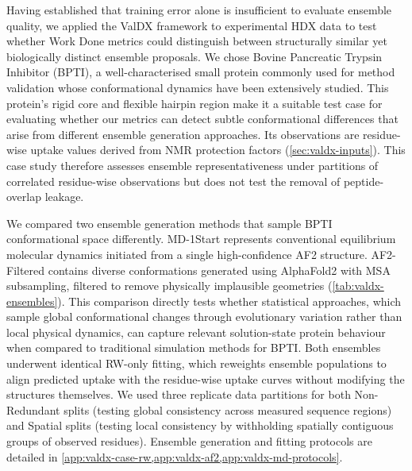 Having established that training error alone is insufficient to evaluate ensemble quality, we applied the ValDX framework to experimental HDX data to test whether Work Done metrics could distinguish between structurally similar yet biologically distinct ensemble proposals. We chose Bovine Pancreatic Trypsin Inhibitor (BPTI), a well-characterised small protein commonly used for method validation whose conformational dynamics have been extensively studied.\supercite{mousaBPTIFoldingRevisited2018,zakharovaFunctionalStructuralRoles2008,qinProteinFoldingGuides2015,shawAtomiclevelCharacterizationStructural2010} This protein's rigid core and flexible hairpin region make it a suitable test case for evaluating whether our metrics can detect subtle conformational differences that arise from different ensemble generation approaches. Its observations are residue-wise uptake values derived from NMR protection factors (\cref{sec:valdx-inputs}). This case study therefore assesses ensemble representativeness under partitions of correlated residue-wise observations but does not test the removal of peptide-overlap leakage.

We compared two ensemble generation methods that sample BPTI conformational space differently. MD-1Start represents conventional equilibrium molecular dynamics initiated from a single high-confidence AF2 structure. AF2-Filtered contains diverse conformations generated using AlphaFold2 with MSA subsampling, filtered to remove physically implausible geometries (\cref{tab:valdx-ensembles}). This comparison directly tests whether statistical approaches, which sample global conformational changes through evolutionary variation rather than local physical dynamics, can capture relevant solution-state protein behaviour when compared to traditional simulation methods for BPTI. Both ensembles underwent identical RW-only fitting, which reweights ensemble populations to align predicted uptake with the residue-wise uptake curves without modifying the structures themselves. We used three replicate data partitions for both Non-Redundant splits (testing global consistency across measured sequence regions) and Spatial splits (testing local consistency by withholding spatially contiguous groups of observed residues). Ensemble generation and fitting protocols are detailed in \cref{app:valdx-case-rw,app:valdx-af2,app:valdx-md-protocols}.

